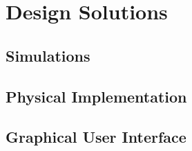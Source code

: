 
\section{Design Solutions}

\subsection{Simulations}

\subsection{Physical Implementation}


\subsection{Graphical User Interface}

